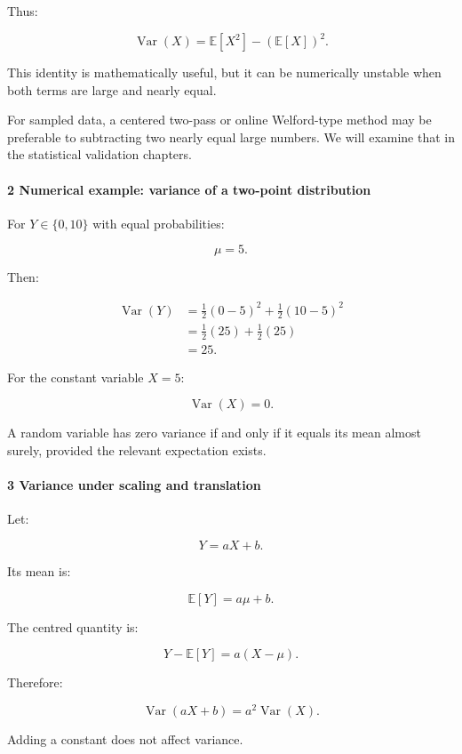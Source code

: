 Thus:

\[
 \boxed{ \operatorname{Var}(X)= \mathbb E[X^2]-(\mathbb E[X])^2 }.
\]

This identity is mathematically useful, but it can be numerically unstable when both terms are large and nearly equal.

For sampled data, a centered two-pass or online Welford-type method may be preferable to subtracting two nearly equal large numbers. We will examine that in the statistical validation chapters.

\paragraph{2 Numerical example: variance of a two-point distribution}\label{numerical-example-variance-of-a-two-point-distribution}

For \(Y\in\{0,10\}\) with equal probabilities:

\[
 \mu=5.
\]

Then:

\[
 \begin{aligned} \operatorname{Var}(Y) &=\frac12(0-5)^2+\frac12(10-5)^2\\ &=\frac12(25)+\frac12(25)\\ &=\boxed{25}. \end{aligned}
\]

For the constant variable \(X=5\):

\[
 \operatorname{Var}(X)=0.
\]

A random variable has zero variance if and only if it equals its mean almost surely, provided the relevant expectation exists.

\paragraph{3 Variance under scaling and translation}\label{variance-under-scaling-and-translation}

Let:

\[
 Y=aX+b.
\]

Its mean is:

\[
 \mathbb E[Y]=a\mu+b.
\]

The centred quantity is:

\[
 Y-\mathbb E[Y]=a(X-\mu).
\]

Therefore:

\[
 \boxed{ \operatorname{Var}(aX+b)=a^2\operatorname{Var}(X) }.
\]

Adding a constant does not affect variance.

